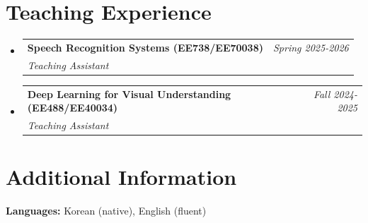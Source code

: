 \documentclass[a4paper,11pt]{article}
\makeatletter
\newcommand{\resumePOR}[3]{
\vspace{0.5mm}\item
    \begin{tabular*}{0.97\textwidth}[t]{l@{\extracolsep{\fill}}r}
        \textbf{#1}\hspace{0.3mm}#2 & \textit{\small{#3}} 
    \end{tabular*}
    \vspace{-2mm}
}
\newcommand{\resumeSubheading}[4]{
\vspace{0.5mm}\item
    \begin{tabular*}{0.98\textwidth}[t]{l@{\extracolsep{\fill}}r}
        \textbf{#1} & \textit{\footnotesize{#4}} \\
        \textit{\footnotesize{#3}} &  \footnotesize{#2}\\
    \end{tabular*}
    \vspace{-2.4mm}
}
\newcommand{\resumeSubHeadingListStart}{\begin{itemize}[leftmargin=*,labelsep=1mm]}
\newcommand{\resumeSubHeadingListEnd}{\end{itemize}\vspace{2mm}}
\makeatother
\begin{document}



\vspace{1mm}
\section{\textbf{Teaching Experience}}
\vspace{-0.4mm}
  \resumeSubHeadingListStart
  \resumeSubheading
      {Speech Recognition Systems (EE738/EE70038)}{}
      {Teaching Assistant}{Spring 2025-2026}
      \vspace{1mm}
  \resumeSubheading
      {Deep Learning for Visual Understanding (EE488/EE40034)}{}
      {Teaching Assistant}{Fall 2024-2025}
      \vspace{1mm}
  \resumeSubHeadingListEnd
\vspace{-5mm}

\vspace{1mm}
\section{\textbf{Additional Information}}
\vspace{-0.4mm}
\small{

\textbf{Languages:} Korean (native), English (fluent)
}
\end{document}
